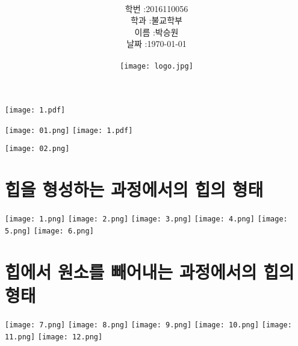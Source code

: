 \documentclass[12pt,a4paper]{article}
\title{
	\centering
	\pgfornament[width=12cm,color=teal]{84}\\
	\vspace{1cm}
	\fontsize{50}{50} \selectfont {컴퓨터 알고리즘과 실습}\\
		\pgfornament[width=12cm,color=teal]{88}\\
	\vfill}
\author{
	\LARGE
	\begin{tabular}{rl}
		\hline
		학번 : & 2016110056\\ 
		학과 : & 불교학부 \\
		이름 : & 박승원\\
		날짜 : & \today\\
		\hline
	\end{tabular}\vspace{2cm}
	\\
\texttt{[image: logo.jpg]}
	}
\date{}
\begin{document}
\maketitle
{}
\noindent
\lstset{language=C++, columns=flexible, tabsize=4, frame=shadowbox, showstringspaces=false, breaklines=true, upquote=true, basicstyle=\normalsize}
\texttt{[image: 1.pdf]}

\texttt{[image: 01.png]}
\texttt{[image: 1.pdf]}

\texttt{[image: 02.png]}

\section{힙을 형성하는 과정에서의 힙의 형태}
\texttt{[image: 1.png]}
\texttt{[image: 2.png]}
\texttt{[image: 3.png]}
\texttt{[image: 4.png]}
\texttt{[image: 5.png]}
\texttt{[image: 6.png]}

\section{힙에서 원소를 빼어내는 과정에서의 힙의 형태}
\texttt{[image: 7.png]}
\texttt{[image: 8.png]}
\texttt{[image: 9.png]}
\texttt{[image: 10.png]}
\texttt{[image: 11.png]}
\texttt{[image: 12.png]}
\end{document}
